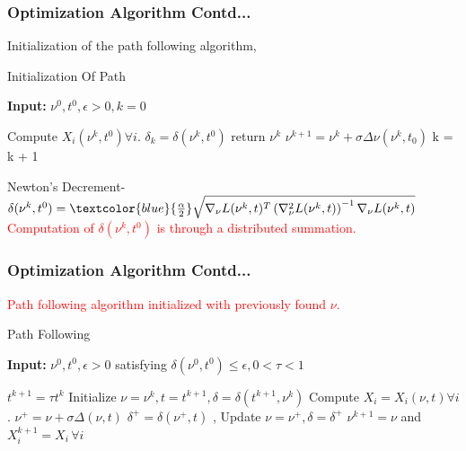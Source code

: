 \documentclass{beamer}
\newcommand\FontviNine{\fontsize{9}{7.2}\selectfont}
\begin{document}
\begin{frame}
\frametitle{Optimization Algorithm Contd...}
\FontviNine
Initialization of the path following algorithm,
\begin{algorithm}[H]
\scriptsize
\caption{Initialization Of Path}
\textbf{Input:} $\nu^0 , t^0 , \epsilon > 0 , k = 0$
\begin{algorithmic}[2]
\State Compute $X_i(\nu^k , t^0)\forall i$. $\delta_k = \delta(\nu^k , t^0)$
\Comment{\textcolor{red}{$X_i$ are computed separately by each agent subject to $A_i X_i = c_i$}}
\State return $\nu^k $ 
\EndIf
\State $\nu^{k+1} = \nu^k + \sigma \Delta\nu(\nu^k , t_0)$ 
\State k = k + 1
\EndWhile
\EndProcedure
\end{algorithmic}
\end{algorithm}
Newton's Decrement- $\delta(\nu^k , t^0) = \textcolor{blue}{\frac{\alpha}{2}} \sqrt{\nabla_{\nu}L(\nu^k,t)^{T} \left(\nabla_{\nu}^2 L(\nu^k,t)\right)^{-1} \nabla_{\nu}L(\nu^k,t)}$
\textcolor{red}{Computation of $\delta(\nu^k , t^0)$ is through a distributed summation.}
\end{frame}
\begin{frame}
\frametitle{Optimization Algorithm Contd...}
\FontviNine
\textcolor{red}{Path following algorithm initialized with previously found $\nu$.}
\begin{algorithm}[H]
\scriptsize
\caption{Path Following}
\textbf{Input:} $\nu^0 , t^0 , \epsilon > 0$ satisfying $\delta{(\nu^0 , t^0)} \leq \epsilon, 0 < \tau < 1$
\begin{algorithmic}[3]
\EndIf
\State $t^{k+1} = \tau t^{k}$
\State Initialize $\nu = \nu^{k} , t = t^{k+1} , \delta = \delta(t^{k+1} , \nu^{k})$
\While{$\delta \geq \epsilon$}
\State Compute $X_i = X_{i}(\nu, t) \forall i$.
\Comment{\textcolor{red}{$X_i$ computed separately by each agent subject to $A_i X_i = c_i$}}
\State $\nu^{+} = \nu + \sigma \Delta(\nu , t)$
\Comment{\textcolor{red}{$\sigma$ is a suitable step length}}
\State $\delta^{+}= \delta(\nu^{+},t)$ , Update $\nu = \nu^{+} , \delta = \delta^{+}$
\EndWhile
\State $\nu^{k+1} = \nu$ and $X_{i}^{k+1} = X_i \, \forall i$
\EndWhile
\EndProcedure
\end{algorithmic}
\end{algorithm}
\end{frame}
\end{document}
